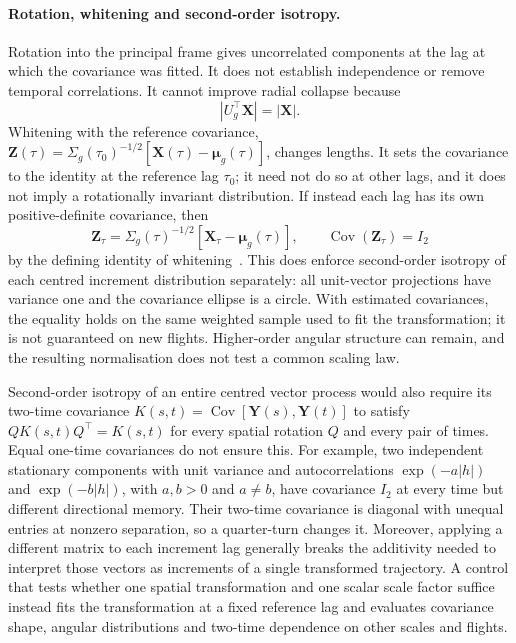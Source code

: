 \paragraph{Rotation, whitening and second-order isotropy.}
Rotation into the principal frame gives uncorrelated components at the lag at which the
covariance was fitted. It does not establish independence or remove temporal
correlations. It cannot improve radial collapse because
\begin{equation}
  |U_g^\top\mathbf X|=|\mathbf X|.
  \label{eq:pca-radius}
\end{equation}
Whitening with the reference covariance,
$\mathbf Z(\tau)=\Sigma_g(\tau_0)^{-1/2}[\mathbf X(\tau)-\boldsymbol\mu_g(\tau)]$,
changes lengths. It sets the covariance to the identity at the reference lag $\tau_0$; it need not
do so at other lags, and it does not imply a rotationally invariant distribution.
If instead each lag has its own positive-definite covariance, then
\begin{equation}
 \mathbf Z_\tau=\Sigma_g(\tau)^{-1/2}
 [\mathbf X_\tau-\boldsymbol\mu_g(\tau)],\qquad
 \operatorname{Cov}(\mathbf Z_\tau)=I_2
 \label{eq:lagwise-whitening}
\end{equation}
by the defining identity of whitening~\cite{kessy2018}. This does enforce
second-order isotropy of each centred increment distribution separately: all
unit-vector projections have variance one and the covariance ellipse is a
circle. With estimated covariances, the equality holds on the same weighted
sample used to fit the transformation; it is not guaranteed on new flights.
Higher-order angular structure can remain, and the resulting normalisation
does not test a common scaling law.

Second-order isotropy of an entire centred vector process would also require
its two-time covariance $K(s,t)=\operatorname{Cov}[\mathbf Y(s),\mathbf Y(t)]$
to satisfy $QK(s,t)Q^\top=K(s,t)$ for every spatial rotation $Q$ and every pair
of times. Equal one-time covariances do not ensure this. For example, two
independent stationary components with unit variance and autocorrelations
$\exp(-a|h|)$ and $\exp(-b|h|)$, with $a,b>0$ and $a\ne b$, have covariance $I_2$ at every
time but different directional memory. Their two-time covariance is diagonal
with unequal entries at nonzero separation, so a quarter-turn changes it.
Moreover, applying a different matrix to each increment lag generally breaks
the additivity needed to interpret those vectors as increments of a single
transformed trajectory. A control that tests whether one spatial transformation
and one scalar scale factor suffice instead fits the transformation at a fixed
reference lag and evaluates covariance shape, angular distributions and
two-time dependence on other scales and flights.

